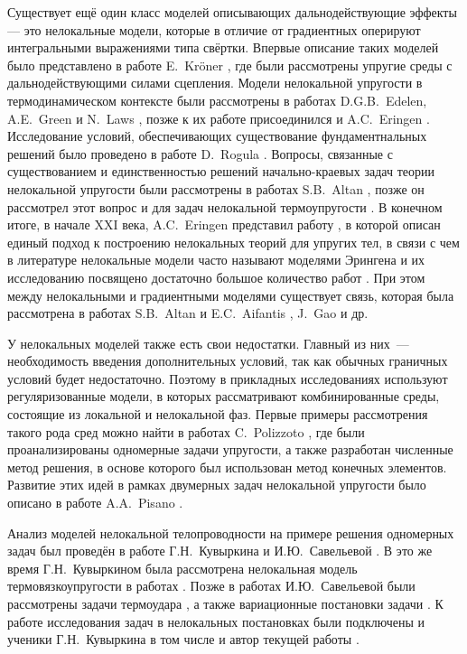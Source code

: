 \ifsynopsis
\else
Существует ещё один класс моделей описывающих дальнодействующие эффекты --- это нелокальные модели, которые в отличие от градиентных оперируют интегральными выражениями типа свёртки. Впервые описание таких моделей было представлено в работе E.~Kr{\"o}ner \cite{Kroner}, где были рассмотрены упругие среды с дальнодействующими силами сцепления. Модели нелокальной упругости в термодинамическом контексте были рассмотрены в работах D.G.B.~Edelen, A.E.~Green и N.~Laws \cite{Edelen1, Edelen2}, позже к их работе присоединился и A.C.~Eringen \cite{Eringen5, Eringen6}. Исследование условий, обеспечивающих существование фундаментнальных решений было проведено в работе D.~Rogula \cite{Rogula1982}. Вопросы, связанные с существованием и единственностью решений начально-краевых задач теории нелокальной упругости были рассмотрены в работах S.B.~Altan \cite{Altan1, Altan2}, позже он рассмотрел этот вопрос и для задач нелокальной термоупругости \cite{Altan3, Altan4}. В конечном итоге, в начале XXI века, A.C.~Eringen представил работу \cite{Eringen1}, в которой описан единый подход к построению нелокальных теорий для упругих тел, в связи с чем в литературе нелокальные модели часто называют моделями Эрингена и их исследованию посвящено достаточно большое количество работ \cite{BondaryLayer, Tuna, Rahmani}. При этом между нелокальными и градиентными моделями существует связь, которая была рассмотрена в работах S.B.~Altan и E.C.~Aifantis \cite{Aifantis3}, J.~Gao \cite{Gao} и др.
\fi

\ifsynopsis
\else
У нелокальных моделей также есть свои недостатки. Главный из них~--- необходимость введения дополнительных условий, так как обычных граничных условий будет недостаточно. Поэтому в прикладных исследованиях используют регуляризованные модели, в которых рассматривают комбинированные среды, состоящие из локальной и нелокальной фаз. Первые примеры рассмотрения такого рода сред можно найти в работах C.~Polizzoto \cite{Polizzotto1, Polizzotto2}, где были проанализированы одномерные задачи упругости, а также разработан численные метод решения, в основе которого был использован метод конечных элементов. Развитие этих идей в рамках двумерных задач нелокальной упругости было описано в работе A.A.~Pisano \cite{Pisano1}.
\fi

\ifsynopsis
\else
Анализ моделей нелокальной телопроводности на примере решения одномерных задач был проведён в работе Г.Н.~Кувыркина и И.Ю.~Савельевой \cite{NonlocalThermal1}. В это же время Г.Н.~Кувыркином была рассмотрена нелокальная модель термовязкоупругости в работах \cite{ThermoViscoElasticity1, ThermoViscoElasticity2, ThermoViscoElasticity3}. Позже в работах И.Ю.~Савельевой были рассмотрены задачи термоудара \cite{ThermoUdar1, ThermoUdar2, ThermoUdar3}, а также вариационные постановки задачи \cite{NonlocalThermalVariation1, NonlocalThermalVariation2}. К работе исследования задач в нелокальных постановках были подключены и ученики Г.Н.~Кувыркина в том числе и автор текущей работы \cite{AMCSM2019, ZAMM, NonlocalSaintVenant, NonlocalRadiation}.
\fi

